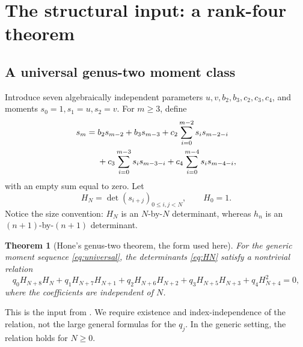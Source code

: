 \documentclass[11pt,letterpaper]{article}
\numberwithin{equation}{section}
\newtheorem{theorem}{Theorem}[section]
\theoremstyle{definition}
\begin{document}
\section{The structural input: a rank-four theorem}
\label{sec:rank}

\subsection{A universal genus-two moment class}

Introduce seven algebraically independent parameters
\(u,v,b_2,b_3,c_2,c_3,c_4\), and moments
\(s_0=1,s_1=u,s_2=v\). For \(m\geq3\), define
\begin{align}
 s_m={}&b_2s_{m-2}+b_3s_{m-3}
       +c_2\sum_{i=0}^{m-2}s_is_{m-2-i}\notag\\
     &+c_3\sum_{i=0}^{m-3}s_is_{m-3-i}
       +c_4\sum_{i=0}^{m-4}s_is_{m-4-i},
 \label{eq:universal}
\end{align}
with an empty sum equal to zero. Let
\begin{equation}
 H_N=\det(s_{i+j})_{0\leq i,j<N},\qquad H_0=1.
 \label{eq:HN}
\end{equation}
Notice the size convention: \(H_N\) is an \(N\)-by-\(N\) determinant,
whereas \(h_n\) is an \((n+1)\)-by-\((n+1)\) determinant.

\begin{theorem}[Hone's genus-two theorem, the form used here]
\label{thm:hone}
For the generic moment sequence \eqref{eq:universal}, the determinants
\eqref{eq:HN} satisfy a nontrivial relation
\begin{equation}
 q_0H_{N+8}H_N+q_1H_{N+7}H_{N+1}
 +q_2H_{N+6}H_{N+2}+q_3H_{N+5}H_{N+3}
 +q_4H_{N+4}^2=0,
 \label{eq:Hone}
\end{equation}
where the coefficients are independent of \(N\).
\end{theorem}

This is the input from \cite[Theorem 5.4, equation (4.22), and the
seven-parameter formulation in its proof]{Hone}. We require existence and
index-independence of the relation, not the large general formulas for the
\(q_j\). In the generic setting, the relation holds for \(N\geq0\).
\end{document}
